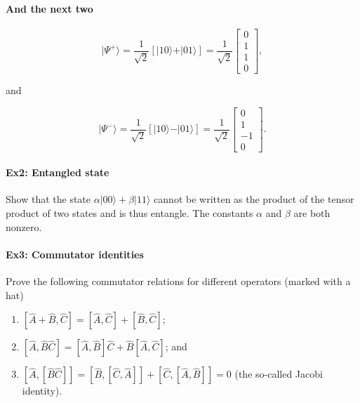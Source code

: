 \paragraph{And the next two}
\[
\vert \Psi^+\rangle = \frac{1}{\sqrt{2}}\left[\vert 10\rangle +\vert 01\rangle\right]=\frac{1}{\sqrt{2}}\begin{bmatrix} 0 \\ 1 \\ 1 \\ 0\end{bmatrix},
\]

and

\[
\vert \Psi^-\rangle = \frac{1}{\sqrt{2}}\left[\vert 10\rangle -\vert 01\rangle\right]=\frac{1}{\sqrt{2}}\begin{bmatrix} 0 \\ 1 \\ -1 \\ 0\end{bmatrix}.
\]


\paragraph{Ex2: Entangled state}

Show that the state $\alpha \vert 00\rangle+\beta\vert 11\rangle$ cannot be written as the product of the tensor product of two states and is thus entangle. The constants  $\alpha$ and $\beta$ are both nonzero.


\paragraph{Ex3: Commutator identities}
Prove the following commutator relations for different operators (marked with a hat)
\begin{enumerate}
\item $[\hat{A}+\hat{B},\hat{C}]= [\hat{A},\hat{C}]+[\hat{B},\hat{C}]$;

\item $[\hat{A},\hat{B}\hat{C}]= [\hat{A},\hat{B}]\hat{C}+\hat{B}[\hat{A},\hat{C}]$; and 

\item $[\hat{A},[\hat{B}\hat{C}]]= [\hat{B},[\hat{C},\hat{A}]]+[\hat{C},[\hat{A},\hat{B}]]=0$ (the so-called Jacobi identity).
\end{enumerate}



